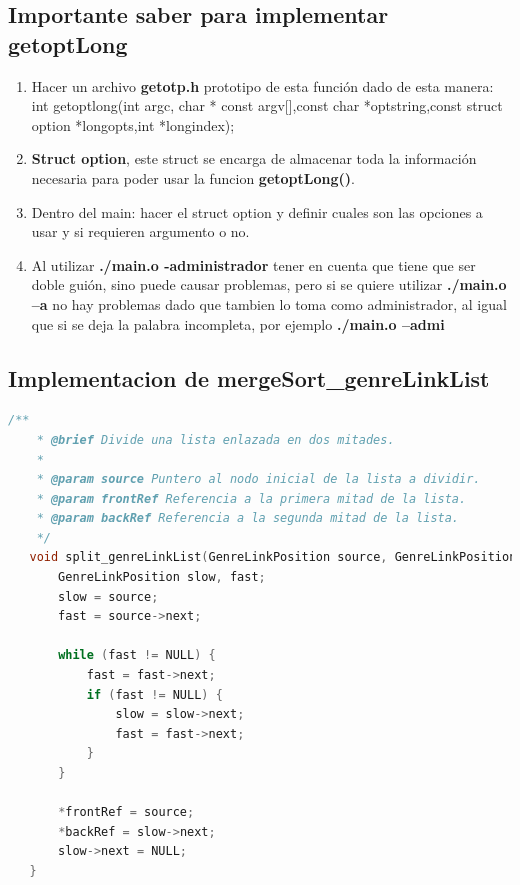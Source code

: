 \subsection*{Importante saber para implementar \textbf{getoptLong}}
\begin{enumerate}
    \item Hacer un archivo \textbf{getotp.h} prototipo de esta función dado de esta manera: int getoptlong(int argc, char * const argv[],const char *optstring,const struct option *longopts,int *longindex);
    \item \textbf{Struct option}, este struct se encarga de almacenar toda la información necesaria para poder usar la funcion \textbf{getoptLong()}.
    \item Dentro del main: hacer el struct option y definir cuales son las opciones a usar y si requieren argumento o no.
    \item Al utilizar \textbf{./main.o -administrador} tener en cuenta que tiene que ser doble guión, sino puede causar problemas, pero si se quiere utilizar \textbf{./main.o --a} no hay problemas dado que tambien lo toma como administrador, al igual que si se deja la palabra incompleta, por ejemplo \textbf{./main.o --admi}
\end{enumerate}

\subsection*{Implementacion de mergeSort\_genreLinkList}
\begin{lstlisting}[style=CodeStyle, language=C, caption={split\_genreLinkList}, label={lst:codigo}]
    /**
    * @brief Divide una lista enlazada en dos mitades.
    *
    * @param source Puntero al nodo inicial de la lista a dividir.
    * @param frontRef Referencia a la primera mitad de la lista.
    * @param backRef Referencia a la segunda mitad de la lista.
    */
   void split_genreLinkList(GenreLinkPosition source, GenreLinkPosition* frontRef, GenreLinkPosition* backRef) {
       GenreLinkPosition slow, fast;
       slow = source;
       fast = source->next;
   
       while (fast != NULL) {
           fast = fast->next;
           if (fast != NULL) {
               slow = slow->next;
               fast = fast->next;
           }
       }
   
       *frontRef = source;
       *backRef = slow->next;
       slow->next = NULL;
   }
\end{lstlisting}

